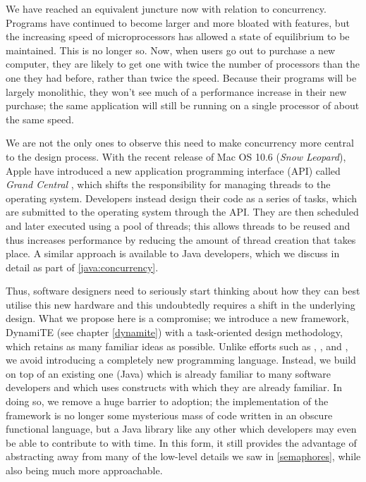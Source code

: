 We have reached an equivalent juncture now with relation to
concurrency.  Programs have continued to become larger and more
bloated with features, but the increasing speed of microprocessors has
allowed a state of equilibrium to be maintained.  This is no longer
so.  Now, when users go out to purchase a new computer, they are
likely to get one with twice the number of processors than the one
they had before, rather than twice the speed.  Because their programs
will be largely monolithic, they won't see much of a performance
increase in their new purchase; the same application will still be
running on a single processor of about the same speed.

We are not the only ones to observe this need to make concurrency more
central to the design process.  With the recent release of Mac OS 10.6
(\emph{Snow Leopard}), Apple have introduced a new application
programming interface (API) called \emph{Grand Central}
\cite{grandcentral}, which shifts the responsibility for managing
threads to the operating system.  Developers instead design their code
as a series of tasks, which are submitted to the operating system
through the API.  They are then scheduled and later executed using a
pool of threads; this allows threads to be reused and thus increases
performance by reducing the amount of thread creation that takes
place.  A similar approach is available to Java developers, which we
discuss in detail as part of \ref{java:concurrency}.

Thus, software designers need to seriously start thinking about how
they can best utilise this new hardware and this undoubtedly requires
a shift in the underlying design.  What we propose here is a
compromise; we introduce a new framework, DynamiTE (see chapter
\ref{dynamite}) with a task-oriented design methodology, which
retains as many familiar ideas as possible.  Unlike efforts such as
\cite{obliq}, \cite{daveturner:phd}, \cite{wojciechowski:phd} and
\cite{sangiorgi:safeambientsmachine}, we avoid introducing a
completely new programming language.  Instead, we build on top of an
existing one (Java) which is already familiar to many software
developers and which uses constructs with which they are already
familiar.  In doing so, we remove a huge barrier to adoption; the
implementation of the framework is no longer some mysterious mass of
code written in an obscure functional language, but a Java library
like any other which developers may even be able to contribute to with
time.  In this form, it still provides the advantage of abstracting
away from many of the low-level details we saw in \ref{semaphores},
while also being much more approachable.

